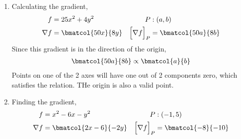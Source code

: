 \begin{enumerate}
    \item Calculating the gradient,
          \begin{align}
              f                      & = 25x^2 + 4y^2      &
              P                      & : (a, b)              \\
              \nabla f               & = \bmatcol{50x}{8y} &
              \Big[ \nabla f \Big]_P & = \bmatcol{50a}{8b}
          \end{align}
          Since this gradient is in the direction of the origin,
          \begin{align}
              \bmatcol{50a}{8b} & \propto \bmatcol{a}{b} \\
          \end{align}
          Points on one of the 2 axes will have one out of 2 components zero, which
          satisfies the relation. THe origin is also a valid point.

    \item Finding the gradient,
          \begin{align}
              f                      & = x^2 - 6x - y^2        &
              P                      & : (-1, 5)                 \\
              \nabla f               & = \bmatcol{2x - 6}{-2y} &
              \Big[ \nabla f \Big]_P & = \bmatcol{-8}{-10}
          \end{align}

          \begin{figure}[H]
              \centering
          \end{figure}


\end{enumerate}
